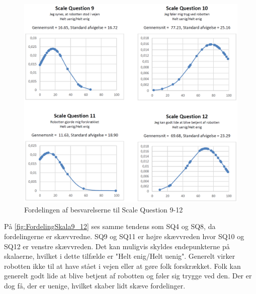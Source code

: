\begin{figure}[H]
\centering
\includegraphics[width =\textwidth]{Figure/DatabehandlingSkalaer/FordelingSkala9_12} 
\caption{Fordelingen af besvarelserne til Scale Question 9-12}
\label{fig:FordelingSkala9_12}
\end{figure}
\noindent

På \autoref{fig:FordelingSkala9_12} ses samme tendens som SQ4 og SQ8, da fordelingerne er skævvredne. SQ9 og SQ11 er højre skævvreden hvor SQ10 og SQ12 er venstre skævvreden.  Det kan muligvis skyldes endepunkterne på skalaerne, hvilket i dette tilfælde er "Helt enig/Helt uenig". Generelt virker robotten ikke til at have stået i vejen eller at gøre folk forskrækket. Folk kan generelt godt lide at blive betjent af robotten og føler sig trygge ved den. Der er dog få, der er uenige, hvilket skaber lidt skæve fordelinger.


